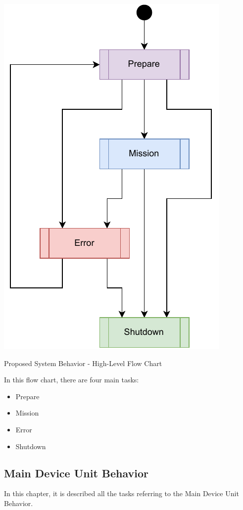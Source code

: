 \begin{algorithm}[H]
    \centering
    \includegraphics[scale=0.8]{ch3/assets/MDU_MAIN.pdf}
    \caption{Proposed System Behavior - High-Level Flow Chart}
    \label{alg:MDU_MAIN}
\end{algorithm}

In this flow chart, there are four main tasks:
\begin{itemize}
    \item Prepare
    \item Mission
    \item Error
    \item Shutdown
\end{itemize}

\subsection{Main Device Unit Behavior}
In this chapter, it is described all the tasks referring to the Main Device Unit Behavior.
